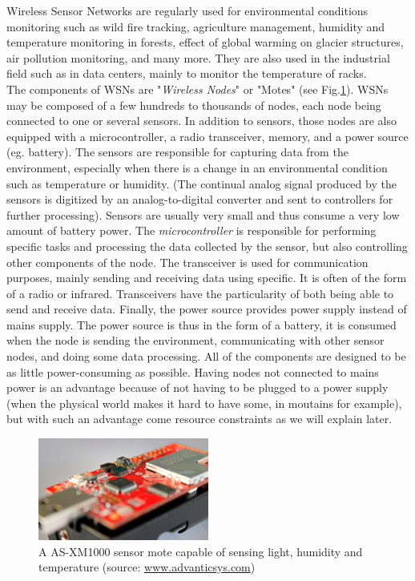 Wireless Sensor Networks are regularly used for environmental conditions monitoring such as wild fire tracking, agriculture management, humidity and temperature monitoring in forests, effect of global warming on glacier structures, air pollution monitoring, and many more. They are also used in the industrial field such as in data centers, mainly to monitor the temperature of racks.  \\

The components of WSNs are "\textit{Wireless Nodes}" or "Motes" (see Fig.\ref{fig:xm1000}). WSNs may be composed of a few hundreds to thousands of nodes, each node being connected to one or several sensors. In addition to sensors, those nodes are also equipped with a microcontroller, a radio transceiver, memory, and a power source (eg. battery). The sensors are responsible for capturing data from the environment, especially when there is a change in an environmental condition such as temperature or humidity. (The continual analog signal produced by the sensors is digitized by an analog-to-digital converter and sent to controllers for further processing). Sensors are usually very small and thus consume a very low amount of battery power. The \textit{microcontroller} is responsible for performing specific tasks and processing the data collected by the sensor, but also controlling other components of the node. The transceiver is used for communication purposes, mainly sending and receiving data using specific. It is often of the form of a radio or infrared. Transceivers have the particularity of both being able to send and receive data. Finally, the power source provides power supply instead of mains supply. The power source is thus in the form of a battery, it is consumed when the node is sending the environment, communicating with other sensor nodes, and doing some data processing. All of the components are designed to be as little power-consuming as possible. Having nodes not connected to mains power is an advantage because of not having to be plugged to a power supply (when the physical world makes it hard to have some, in moutains for example), but with such an advantage come resource constraints as we will explain later.  \\

\begin{figure}
  \centering
  \includegraphics[width=0.5\textwidth]{res/xm1000.png}
  \caption{A AS-XM1000 sensor mote capable of sensing light, humidity and temperature (source: \url{www.advanticsys.com})}
  \label{fig:xm1000}
\end{figure}

